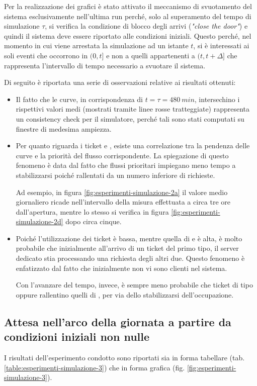 Per la realizzazione dei grafici è stato attivato il meccanismo di svuotamento del sistema esclusivamente nell'ultima run perché, solo al superamento del tempo di simulazione $\tau$, si verifica la condizione di blocco degli arrivi (\textit{"close the door"}) e quindi il sistema deve essere riportato alle condizioni iniziali. Questo perché, nel momento in cui viene arrestata la simulazione ad un istante $t$, si è interessati ai soli eventi che occorrono in $(0, t]$ e non a quelli appartenenti a $(t, t + \Delta]$ che rappresenta l'intervallo di tempo necessario a svuotare il sistema.

Di seguito è riportata una serie di osservazioni relative ai risultati ottenuti:
\begin{itemize}
\item Il fatto che le curve, in corrispondenza di $t = \tau = 480\ min$, intersechino i rispettivi valori medi (mostrati tramite linee rosse tratteggiate) rappresenta un consistency check per il simulatore, perché tali sono stati computati su finestre di medesima ampiezza.
\item Per quanto riguarda i ticket \uo{} e \pp{}, esiste una correlazione tra la pendenza delle curve e la priorità del flusso corrispondente. La spiegazione di questo fenomeno è data dal fatto che flussi prioritari impiegano meno tempo a stabilizzarsi poiché rallentati da un numero inferiore di richieste.

Ad esempio, in figura \ref{fig:esperimenti-simulazione-2a} il valore medio giornaliero ricade nell'intervallo della misura effettuata a circa tre ore dall'apertura, mentre lo stesso si verifica in figura \ref{fig:esperimenti-simulazione-2d} dopo circa cinque.
\item Poiché l'utilizzazione dei ticket \sr{} è bassa, mentre quella di \uo{} e \pp{} è alta, è molto probabile che inizialmente all'arrivo di un ticket del primo tipo, il server dedicato stia processando una richiesta degli altri due. Questo fenomeno è enfatizzato dal fatto che inizialmente non vi sono clienti nel sistema.

Con l'avanzare del tempo, invece, è sempre meno probabile che ticket di tipo \uo{} oppure \pp{} rallentino quelli di \sr{}, per via dello stabilizzarsi dell'occupazione. 
\end{itemize}

\subsection*{Attesa nell'arco della giornata a partire da condizioni iniziali non nulle}
I risultati dell'esperimento condotto sono riportati sia in forma tabellare (tab. \ref{table:esperimenti-simulazione-3}) che in forma grafica (fig. \ref{fig:esperimenti-simulazione-3}).

